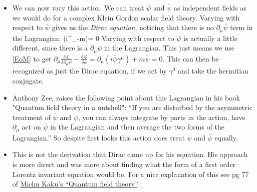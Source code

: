 \documentclass[11pt]{article}
\renewenvironment{flalign}{\vspace{-2mm}\empheq[box=\tcbhighmath]{align}}{\endempheq}
\numberwithin{equation}{section}
\begin{document}
\begin{itemize}
  \item We can now vary this action. We can treat $\psi$ and $\bar{\psi}$ as independent fields as we would do for a complex Klein Gordon scalar field theory. Varying with respect to $\bar{\psi}$ gives us the \emph{Dirac equation}, noticing that there is no $\partial_{\mu}\bar{\psi}$ term in the Lagrangian:
  \begin{flalign}
  \label{Dirac}
      (i\gamma^{\mu}\partial_{\mu}-m)\psi = 0
    \end{flalign} 
    Varying with respect to $\psi$ is actually a little different, since there is a $\partial_{\mu}\psi$ in the Lagrangian. This just means we use \ref{EoM} to get $\partial_{\mu}\frac{\delta \mathcal{L}}{\delta \partial_{\mu} \psi}-\frac{\delta \mathcal{L}}{\delta \psi}  = \partial_{\mu}(i\bar{\psi}\gamma^{\mu})+m\bar{\psi}=0$. This can then be recognized as just the Dirac equation, if we act by $\gamma^{0}$ and take the hermitian conjugate. 

\item Anthony Zee, raises the following point about this Lagrangian in his book "Quantum field theory in a nutshell": ``If you are disturbed by the asymmetric treatment of $\bar{\psi}$ and $\psi$, you can always integrate by parts in the action, have $\partial_{\mu}$  act on $\bar{\psi}$ in the Lagrangian and then average the two forms of the Lagrangian.'' So despite first looks this action does treat $\psi$ and $\bar{\psi}$ equally. 

\item This is not the derivation that Dirac came up for his equation. His approach is more direct and was more about finding what the form of a first order Lorentz invariant equation would be. For a nice explanation of this see pg 77 of  \href{https://archive.org/details/quantumfieldtheo0000kaku}{Michu Kaku's ``Quantum field theory''}. 


\end{itemize}
\end{document}

